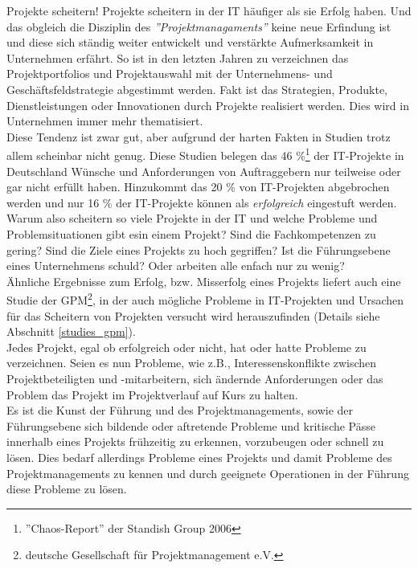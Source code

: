 \documentclass[11pt]{scrartcl}
\begin{document}
Projekte scheitern! Projekte scheitern in der IT häufiger als sie Erfolg haben. Und das obgleich die Disziplin des \textit{''Projektmanagaments''} keine neue Erfindung ist und diese sich ständig weiter entwickelt und verstärkte Aufmerksamkeit in Unternehmen erfährt. So ist in den letzten Jahren zu verzeichnen das Projektportfolios und Projektauswahl mit der Unternehmens- und Geschäftsfeldstrategie abgestimmt werden. Fakt ist das Strategien, Produkte, Dienstleistungen oder Innovationen durch Projekte realisiert werden. Dies wird in Unternehmen immer mehr thematisiert.\\
Diese Tendenz ist zwar gut, aber aufgrund der harten Fakten in Studien trotz allem scheinbar nicht genug. Diese Studien belegen das 46 \%\footnote{''Chaos-Report'' der Standish Group 2006} der IT-Projekte in Deutschland Wünsche und Anforderungen von Auftraggebern nur teilweise oder gar nicht erfüllt haben. Hinzukommt das 20 \% von IT-Projekten abgebrochen werden und nur 16 \% der IT-Projekte können als \textit{erfolgreich} eingestuft werden. Warum also scheitern so viele Projekte in der IT und welche Probleme und Problemsituationen gibt esin einem Projekt? Sind die Fachkompetenzen zu gering? Sind die Ziele eines Projekts zu hoch gegriffen? Ist die Führungsebene eines Unternehmens schuld? Oder arbeiten alle enfach nur zu wenig?\\
Ähnliche Ergebnisse zum Erfolg, bzw. Misserfolg eines Projekts liefert auch eine Studie der GPM\footnote{deutsche Gesellschaft für Projektmanagement e.V.}, in der auch mögliche Probleme in IT-Projekten und Ursachen für das Scheitern von Projekten versucht wird herauszufinden (Details siehe Abschnitt \ref{studies_gpm}).\\ 
Jedes Projekt, egal ob erfolgreich oder nicht, hat oder hatte Probleme zu verzeichnen. Seien es nun Probleme, wie z.B., Interessenskonflikte zwischen Projektbeteiligten und -mitarbeitern, sich ändernde Anforderungen oder das Problem das Projekt im Projektverlauf auf Kurs zu halten. \\
Es ist die Kunst der Führung und des Projektmanagements, sowie der Führungsebene sich bildende oder aftretende Probleme  und kritische Pässe innerhalb eines Projekts frühzeitig zu erkennen, vorzubeugen oder schnell zu lösen. Dies bedarf allerdings Probleme eines Projekts und damit Probleme des Projektmanagements zu kennen und durch geeignete Operationen in der Führung diese Probleme zu lösen.

\pagebreak
\end{document}

